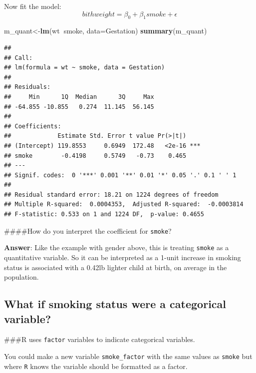 \documentclass[]{article}
\newenvironment{Shaded}{\begin{snugshade}}{\end{snugshade}}
\newcommand{\DataTypeTok}[1]{\textcolor[rgb]{0.13,0.29,0.53}{#1}}
\newcommand{\KeywordTok}[1]{\textcolor[rgb]{0.13,0.29,0.53}{\textbf{#1}}}
\newcommand{\NormalTok}[1]{#1}
\newcommand{\OperatorTok}[1]{\textcolor[rgb]{0.81,0.36,0.00}{\textbf{#1}}}
\newcommand{\StringTok}[1]{\textcolor[rgb]{0.31,0.60,0.02}{#1}}
\begin{document}
Now fit the model: \[bithweight=\beta_0+\beta_1 smoke+ \epsilon\]

\begin{Shaded}
\begin{Highlighting}[]
\NormalTok{m_quant<-}\KeywordTok{lm}\NormalTok{(wt}\OperatorTok{~}\NormalTok{smoke, }\DataTypeTok{data=}\NormalTok{Gestation)}
\KeywordTok{summary}\NormalTok{(m_quant)}
\end{Highlighting}
\end{Shaded}

\begin{verbatim}
## 
## Call:
## lm(formula = wt ~ smoke, data = Gestation)
## 
## Residuals:
##     Min      1Q  Median      3Q     Max 
## -64.855 -10.855   0.274  11.145  56.145 
## 
## Coefficients:
##             Estimate Std. Error t value Pr(>|t|)    
## (Intercept) 119.8553     0.6949  172.48   <2e-16 ***
## smoke        -0.4198     0.5749   -0.73    0.465    
## ---
## Signif. codes:  0 '***' 0.001 '**' 0.01 '*' 0.05 '.' 0.1 ' ' 1
## 
## Residual standard error: 18.21 on 1224 degrees of freedom
## Multiple R-squared:  0.0004353,  Adjusted R-squared:  -0.0003814 
## F-statistic: 0.533 on 1 and 1224 DF,  p-value: 0.4655
\end{verbatim}

\#\#\#\#How do you interpret the coefficient for \texttt{smoke}?

\textbf{Answer}: Like the example with gender above, this is treating
\texttt{smoke} as a quantitative variable. So it can be interpreted as a
1-unit increase in smoking status is associated with a 0.42lb lighter
child at birth, on average in the population.

\newpage

\hypertarget{what-if-smoking-status-were-a-categorical-variable}{%
\subsection{What if smoking status were a categorical
variable?}\label{what-if-smoking-status-were-a-categorical-variable}}

\#\#\#R uses \texttt{factor} variables to indicate categorical
variables.

You could make a new variable \texttt{smoke\_factor} with the same
values as \texttt{smoke} but where \texttt{R} knows the variable should
be formatted as a factor.

\begin{Shaded}
\end{Shaded}
\end{document}
